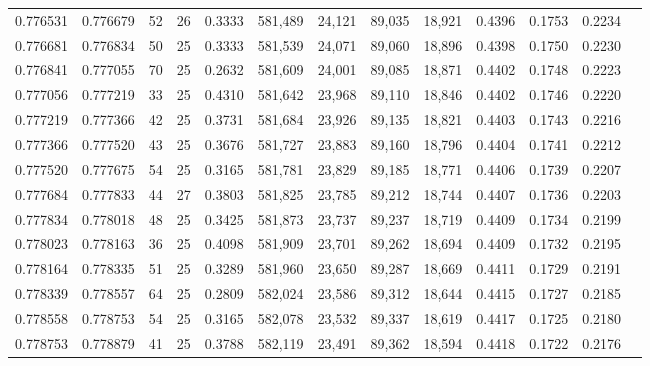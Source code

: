\begin{tabular}{rrrrrrrrrrrrr}
0.776531 & 0.776679 &    52 &  26 &                                     0.3333 & 581,489 &  24,121 &  89,035 &  18,921 & 0.4396 & 0.1753 & 0.2234 \\
0.776681 & 0.776834 &    50 &  25 &                                     0.3333 & 581,539 &  24,071 &  89,060 &  18,896 & 0.4398 & 0.1750 & 0.2230 \\
0.776841 & 0.777055 &    70 &  25 &                                     0.2632 & 581,609 &  24,001 &  89,085 &  18,871 & 0.4402 & 0.1748 & 0.2223 \\
0.777056 & 0.777219 &    33 &  25 &                                     0.4310 & 581,642 &  23,968 &  89,110 &  18,846 & 0.4402 & 0.1746 & 0.2220 \\
0.777219 & 0.777366 &    42 &  25 &                                     0.3731 & 581,684 &  23,926 &  89,135 &  18,821 & 0.4403 & 0.1743 & 0.2216 \\
0.777366 & 0.777520 &    43 &  25 &                                     0.3676 & 581,727 &  23,883 &  89,160 &  18,796 & 0.4404 & 0.1741 & 0.2212 \\
0.777520 & 0.777675 &    54 &  25 &                                     0.3165 & 581,781 &  23,829 &  89,185 &  18,771 & 0.4406 & 0.1739 & 0.2207 \\
0.777684 & 0.777833 &    44 &  27 &                                     0.3803 & 581,825 &  23,785 &  89,212 &  18,744 & 0.4407 & 0.1736 & 0.2203 \\
0.777834 & 0.778018 &    48 &  25 &                                     0.3425 & 581,873 &  23,737 &  89,237 &  18,719 & 0.4409 & 0.1734 & 0.2199 \\
0.778023 & 0.778163 &    36 &  25 &                                     0.4098 & 581,909 &  23,701 &  89,262 &  18,694 & 0.4409 & 0.1732 & 0.2195 \\
0.778164 & 0.778335 &    51 &  25 &                                     0.3289 & 581,960 &  23,650 &  89,287 &  18,669 & 0.4411 & 0.1729 & 0.2191 \\
0.778339 & 0.778557 &    64 &  25 &                                     0.2809 & 582,024 &  23,586 &  89,312 &  18,644 & 0.4415 & 0.1727 & 0.2185 \\
0.778558 & 0.778753 &    54 &  25 &                                     0.3165 & 582,078 &  23,532 &  89,337 &  18,619 & 0.4417 & 0.1725 & 0.2180 \\
0.778753 & 0.778879 &    41 &  25 &                                     0.3788 & 582,119 &  23,491 &  89,362 &  18,594 & 0.4418 & 0.1722 & 0.2176 \\

\end{tabular}
